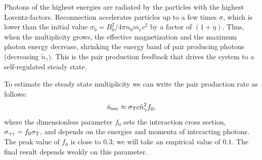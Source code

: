 
Photons of the highest energies are radiated by the particles with the highest Lorentz-factors. Reconnection accelerates particles up to a few times $\sigma$, which is lower than the initial value $\sigma_0=B_0^2/4\pi n_0 m_e c^2$ by a factor of $(1+\eta)$. Thus, when the multiplicity grows, the effective magnetization and the maximum photon energy decrease, shrinking the energy band of pair producing photons (decreasing $\tilde{n}_{\gamma})$. This is the pair production feedback that drives the system to a self-regulated steady state.

To estimate the steady state multiplicity we can write the pair production rate as follows:
\begin{equation}\label{eq:pair_rate}
    \dot{n}_{\rm sec} \approx \sigma_{\rm T} c \tilde{n}_\gamma^2 f_0,
\end{equation}
where the dimensionless parameter $f_0$ sets the interaction cross section, $\sigma_{\gamma\gamma} = f_0 \sigma_{\rm T}$, and depends on the energies and momenta of interacting photons. The peak value of $f_0$ is close to $0.3$; we will take an empirical value of $0.1$. The final result depends weakly on this parameter.

